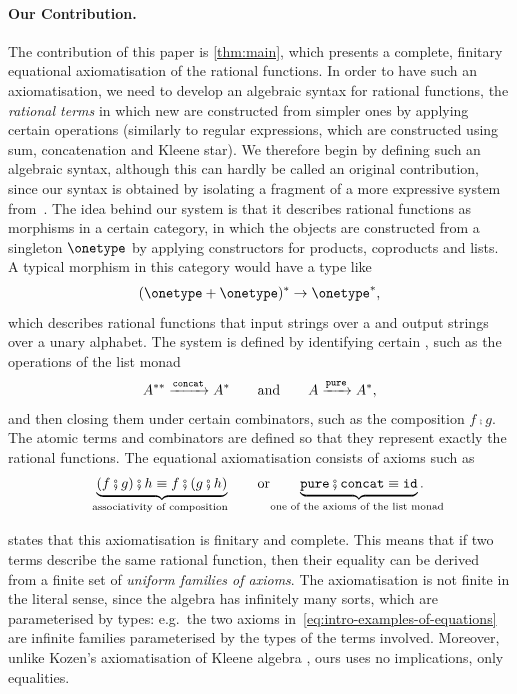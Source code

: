 \paragraph*{Our Contribution.} The contribution of this paper is \cref{thm:main}, which presents a complete, finitary equational axiomatisation of the rational functions. In order to have such an axiomatisation, we need to develop an algebraic syntax for rational functions, the \emph{rational terms} in which new  are constructed from simpler ones by applying certain operations (similarly to regular expressions, which are constructed using sum, concatenation and Kleene star). We therefore begin by defining such an algebraic syntax, although this can hardly be called an original contribution, since our syntax is obtained by  isolating a fragment  of a more expressive system from~\cite{BojanczykDaviaudKrishna2018}. The idea behind our system is that it describes rational functions as morphisms in a certain category, in which the objects are constructed from a singleton  $\onetype$ by applying constructors for products, coproducts and lists. A typical morphism in this category would have a type like
\begin{align*}
(\onetype + \onetype)^* \to \onetype^*,
\end{align*}
which describes rational functions that input strings over a  and output strings over a unary alphabet. The system is defined by identifying certain , such as the operations of the list monad
\begin{align*}
A^{**} \xrightarrow {\mathtt{concat}} A^* \qquad \text{and} \qquad A \xrightarrow {\mathtt{pure}} A^*,
\end{align*}
and then closing them under certain combinators, such as the composition $f\comp{}g$. The atomic terms and combinators are defined so that they represent exactly the rational functions. The equational axiomatisation consists of axioms such as
\begin{equation}
    \label{eq:intro-examples-of-equations}
\myunderbrace{(f\comp{}g)\comp{}h \equiv f\comp(g\comp{}h)}{associativity of composition}
\qquad \text{or} \qquad 
\myunderbrace{\pureterm\comp\concatterm \equiv \idterm}{one of the axioms  of the list monad}.
\end{equation}

 states that this axiomatisation is finitary and complete. This means that if two terms describe the same rational function, then their equality can be derived from a finite set of \emph{uniform families of axioms}. The axiomatisation is not finite in the literal sense, since the algebra has infinitely many sorts, which are parameterised by types: e.g.~the two axioms in~\eqref{eq:intro-examples-of-equations} are infinite families parameterised by the types of the terms involved. Moreover, unlike Kozen's axiomatisation of Kleene algebra \cite{Kozen1994}, ours uses no implications, only equalities.

